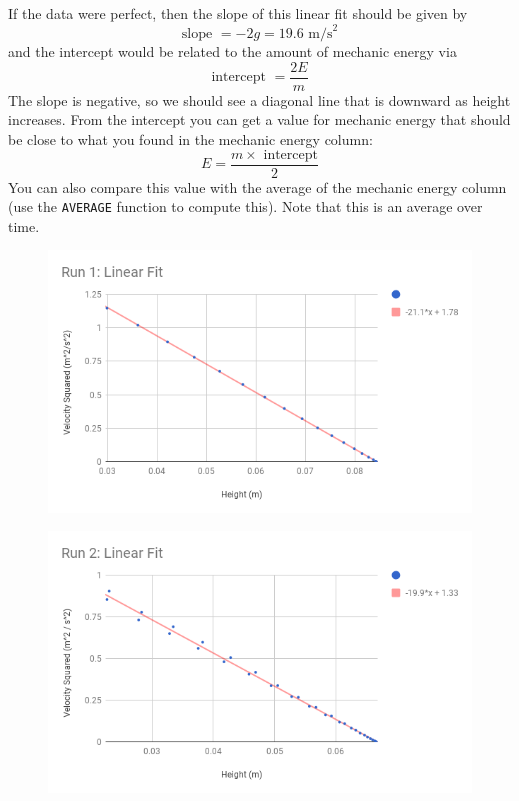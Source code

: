 If the data were perfect, then the slope of this linear fit should be given by
\begin{equation} \label{eq.07.slope}
    \text{slope } = -2g = 19.6 \text{ m/s}^{2}
\end{equation}
and the intercept would be related to the amount of mechanic energy via
\begin{equation}
    \text{intercept } = \frac{2 E}{m}
\end{equation}
The slope is negative, so we should see a diagonal line that is downward as height increases. From the intercept you can get a value for mechanic energy that should be close to what you found in the mechanic energy column:
\begin{equation} \label{eq.07.intercept}
    E = \frac{m \times \text{ intercept}}{2}
\end{equation}
You can also compare this value with the average of the mechanic energy column (use the \texttt{AVERAGE} function to compute this). Note that this is an average over time.
\begin{figure} \label{figure.07.run.1.fit}
    \centering
    \includegraphics[scale=0.71]{image/07-mechanic/run-1-fit.png}
    \caption{}
\end{figure}
\begin{figure} \label{figure.07.run.2.fit}
    \centering
    \includegraphics[scale=0.71]{image/07-mechanic/run-2-fit.png}
    \caption{}
\end{figure}
